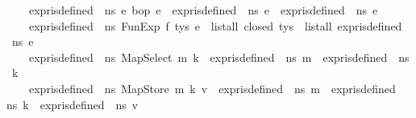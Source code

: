 \begin{isabellebody}
\ \ \ {\isacharbar}{\kern0pt}\ {\isachardoublequoteopen}expr{\isacharunderscore}{\kern0pt}is{\isacharunderscore}{\kern0pt}defined\ {\isasymLambda}\ ns\ {\isacharparenleft}{\kern0pt}e{}\ {\isasymguillemotleft}bop{\isasymguillemotright}\ e{}{\isacharparenright}{\kern0pt}\ {\isacharequal}{\kern0pt}\ {\isacharparenleft}{\kern0pt}{\isacharparenleft}{\kern0pt}expr{\isacharunderscore}{\kern0pt}is{\isacharunderscore}{\kern0pt}defined\ {\isasymLambda}\ ns\ e{}{\isacharparenright}{\kern0pt}\ {\isasymand}\ {\isacharparenleft}{\kern0pt}expr{\isacharunderscore}{\kern0pt}is{\isacharunderscore}{\kern0pt}defined\ {\isasymLambda}\ ns\ e{}{\isacharparenright}{\kern0pt}{\isacharparenright}{\kern0pt}{\isachardoublequoteclose}\isanewline
\ \ \ {\isacharbar}{\kern0pt}\ {\isachardoublequoteopen}expr{\isacharunderscore}{\kern0pt}is{\isacharunderscore}{\kern0pt}defined\ {\isasymLambda}\ ns\ {\isacharparenleft}{\kern0pt}FunExp\ f\ tys\ e{\isacharparenright}{\kern0pt}\ {\isacharequal}{\kern0pt}\ {\isacharparenleft}{\kern0pt}{\isacharparenleft}{\kern0pt}list{\isacharunderscore}{\kern0pt}all\ closed\ tys{\isacharparenright}{\kern0pt}\ {\isasymand}\ {\isacharparenleft}{\kern0pt}list{\isacharunderscore}{\kern0pt}all\ {\isacharparenleft}{\kern0pt}expr{\isacharunderscore}{\kern0pt}is{\isacharunderscore}{\kern0pt}defined\ {\isasymLambda}\ ns{\isacharparenright}{\kern0pt}\ e{\isacharparenright}{\kern0pt}{\isacharparenright}{\kern0pt}{\isachardoublequoteclose}\isanewline
\ \ \ {\isacharbar}{\kern0pt}\ {\isachardoublequoteopen}expr{\isacharunderscore}{\kern0pt}is{\isacharunderscore}{\kern0pt}defined\ {\isasymLambda}\ ns\ {\isacharparenleft}{\kern0pt}MapSelect\ m\ k{\isacharparenright}{\kern0pt}\ {\isacharequal}{\kern0pt}\ {\isacharparenleft}{\kern0pt}{\isacharparenleft}{\kern0pt}expr{\isacharunderscore}{\kern0pt}is{\isacharunderscore}{\kern0pt}defined\ {\isasymLambda}\ ns\ m{\isacharparenright}{\kern0pt}\ {\isasymand}\ {\isacharparenleft}{\kern0pt}expr{\isacharunderscore}{\kern0pt}is{\isacharunderscore}{\kern0pt}defined\ {\isasymLambda}\ ns\ k{\isacharparenright}{\kern0pt}{\isacharparenright}{\kern0pt}{\isachardoublequoteclose}\isanewline
\ \ \ {\isacharbar}{\kern0pt}\ {\isachardoublequoteopen}expr{\isacharunderscore}{\kern0pt}is{\isacharunderscore}{\kern0pt}defined\ {\isasymLambda}\ ns\ {\isacharparenleft}{\kern0pt}MapStore\ m\ k\ v{\isacharparenright}{\kern0pt}\ {\isacharequal}{\kern0pt}\ {\isacharparenleft}{\kern0pt}{\isacharparenleft}{\kern0pt}expr{\isacharunderscore}{\kern0pt}is{\isacharunderscore}{\kern0pt}defined\ {\isasymLambda}\ ns\ m{\isacharparenright}{\kern0pt}\ {\isasymand}\ {\isacharparenleft}{\kern0pt}expr{\isacharunderscore}{\kern0pt}is{\isacharunderscore}{\kern0pt}defined\ {\isasymLambda}\ ns\ k{\isacharparenright}{\kern0pt}\ {\isasymand}\ {\isacharparenleft}{\kern0pt}expr{\isacharunderscore}{\kern0pt}is{\isacharunderscore}{\kern0pt}defined\ {\isasymLambda}\ ns\ v{\isacharparenright}{\kern0pt}{\isacharparenright}{\kern0pt}{\isachardoublequoteclose}\isanewline

\end{isabellebody}
